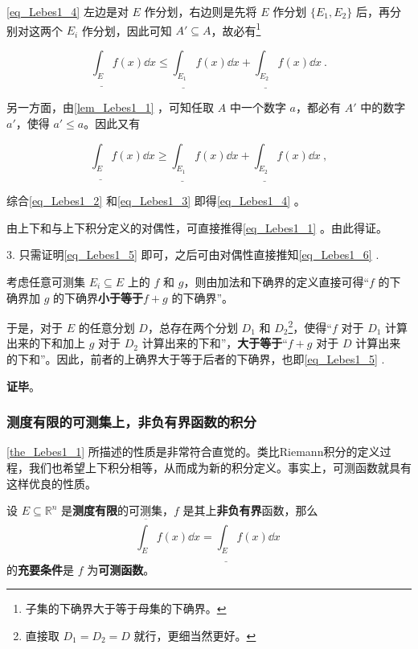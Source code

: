 \autoref{eq_Lebes1_4} 左边是对 $E$ 作分划，右边则是先将 $E$ 作分划 $\{E_1, E_2\}$ 后，再分别对这两个 $E_i$ 作分划，因此可知 $A'\subseteq A$，故必有\footnote{子集的下确界大于等于母集的下确界。}

 \begin{equation}\label{eq_Lebes1_2}
  \underline{\int_E} f(x) \dd x \leq \underline{\int_{E_1}} f(x) \dd x+\underline{\int_{E_2}} f(x) \dd x~.
  \end{equation}

另一方面，由\autoref{lem_Lebes1_1} ，可知任取 $A$ 中一个数字 $a$，都必有 $A'$ 中的数字 $a'$，使得 $a'\leq a$。因此又有

\begin{equation}\label{eq_Lebes1_3}
\underline{\int_E} f(x) \dd x \geq \underline{\int_{E_1}} f(x) \dd x+\underline{\int_{E_2}} f(x) \dd x~,
\end{equation}

综合\autoref{eq_Lebes1_2} 和\autoref{eq_Lebes1_3} 即得\autoref{eq_Lebes1_4} 。

由上下和与上下积分定义的对偶性，可直接推得\autoref{eq_Lebes1_1} 。由此得证。

3. 只需证明\autoref{eq_Lebes1_5} 即可，之后可由对偶性直接推知\autoref{eq_Lebes1_6} .

考虑任意可测集 $E_i\subseteq E$ 上的 $f$ 和 $g$，则由加法和下确界的定义直接可得“$f$ 的下确界加 $g$ 的下确界\textbf{小于等于}$f+g$ 的下确界”。

于是，对于 $E$ 的任意分划 $D$，总存在两个分划 $D_1$ 和 $D_2$\footnote{直接取 $D_1=D_2=D$ 就行，更细当然更好。}，使得“$f$ 对于 $D_1$ 计算出来的下和加上 $g$ 对于 $D_2$ 计算出来的下和”，\textbf{大于等于}“$f+g$ 对于 $D$ 计算出来的下和”。因此，前者的上确界大于等于后者的下确界，也即\autoref{eq_Lebes1_5} .

\textbf{证毕}。







\subsubsection{测度有限的可测集上，非负有界函数的积分}

\autoref{the_Lebes1_1} 所描述的性质是非常符合直觉的。类比Riemann积分的定义过程，我们也希望上下积分相等，从而成为新的积分定义。事实上，可测函数就具有这样优良的性质。

\begin{theorem}{}\label{the_Lebes1_2}
设 $E\subseteq \mathbb{R}^n$ 是\textbf{测度有限}的可测集，$f$ 是其上\textbf{非负有界}函数，那么
\begin{equation}\label{eq_Lebes1_7}
\overline{\int_E} f(x) \dd x = \underline{\int_E} f(x) \dd x~
\end{equation}
的\textbf{充要条件}是 $f$ 为\textbf{可测函数}。
\end{theorem}




